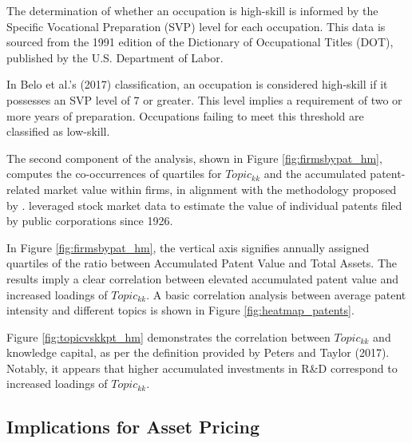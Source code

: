 \documentclass[12pt, letterpaper]{article}
\begin{document}
The determination of whether an occupation is high-skill is informed by the Specific Vocational Preparation (SVP) level for each occupation. This data is sourced from the 1991 edition of the Dictionary of Occupational Titles (DOT), published by the U.S. Department of Labor. 

In Belo et al.'s (2017) classification, an occupation is considered high-skill if it possesses an SVP level of 7 or greater. This level implies a requirement of two or more years of preparation. Occupations failing to meet this threshold are classified as low-skill.


The second component of the analysis, shown in Figure \ref{fig:firmsbypat_hm}, computes the co-occurrences of quartiles for $Topic_{kk}$ and the accumulated patent-related market value within firms, in alignment with the methodology proposed by \cite{Kogan2017-fx}. \cite{Kogan2017-fx} leveraged stock market data to estimate the value of individual patents filed by public corporations since 1926. 

 In Figure \ref{fig:firmsbypat_hm}, the vertical axis signifies annually assigned quartiles of the ratio between Accumulated Patent Value and Total Assets. The results imply a clear correlation between elevated accumulated patent value and increased loadings of $Topic_{kk}$. A basic correlation analysis between average patent intensity and different topics is shown in Figure \ref{fig:heatmap_patents}.



Figure \ref{fig:topicvskkpt_hm} demonstrates the correlation between $Topic_{kk}$ and knowledge capital, as per the definition provided by Peters and Taylor (2017). Notably, it appears that higher accumulated investments in R\&D correspond to increased loadings of $Topic_{kk}$. 


\subsection{Implications for Asset Pricing}
\end{document}
